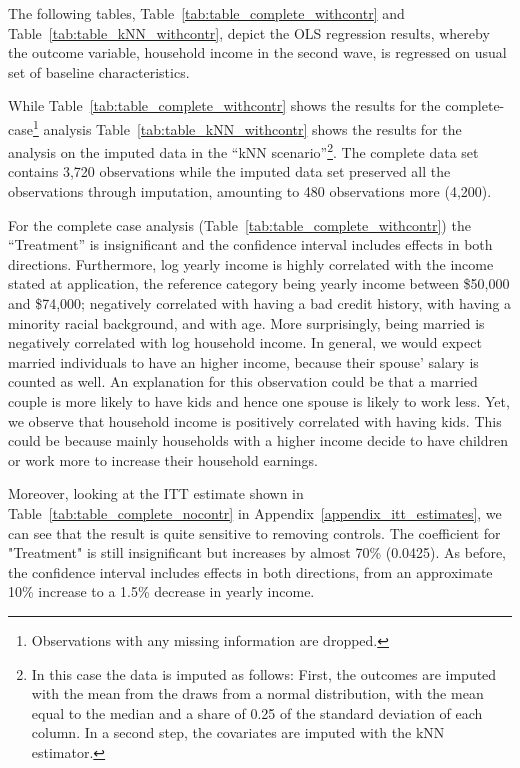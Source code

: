 The following tables, Table~\ref{tab:table_complete_withcontr} and Table~\ref{tab:table_kNN_withcontr}, depict the \ac{OLS} regression results, whereby the outcome variable, household income in the second wave, is regressed on usual set of baseline characteristics.

While Table~\ref{tab:table_complete_withcontr} shows the results for the complete-case\footnote{Observations with any missing information are dropped.} analysis Table~\ref{tab:table_kNN_withcontr} shows the results for the analysis on the imputed data in the ``\ac{kNN} scenario''\footnote{In this case the data is imputed as follows: First, the outcomes are imputed with the mean from the draws from a normal distribution, with the mean equal to the median and a share of 0.25 of the standard deviation of each column. In a second step, the covariates are imputed with the \ac{kNN} estimator.}. The complete data set contains 3,720 observations while the imputed data set preserved all the observations through imputation, amounting to 480 observations more (4,200).

For the complete case analysis (Table~\ref{tab:table_complete_withcontr}) the ``Treatment'' is insignificant and the confidence interval includes effects in both directions. Furthermore, log yearly income is highly correlated with the income stated at application, the reference category being yearly income between \$50,000 and \$74,000; negatively correlated with having a bad credit history, with having a minority racial background, and with age. More surprisingly, being married is negatively correlated with log household income. In general, we would expect married individuals to have an higher income, because their spouse' salary is counted as well. An explanation for this observation could be that a married couple is more likely to have kids and hence one spouse is likely to work less. Yet, we observe that household income is positively correlated with having kids. This could be because mainly households with a higher income decide to have children or work more to increase their household earnings.

Moreover, looking at the \ac{ITT} estimate shown in Table~\ref{tab:table_complete_nocontr} in Appendix~\ref{appendix_itt_estimates}, we can see that the result is quite sensitive to removing controls. The coefficient for "Treatment" is still insignificant but increases by almost 70\% (0.0425). As before, the confidence interval includes effects in both directions, from an approximate 10\% increase to a 1.5\% decrease in yearly income.

